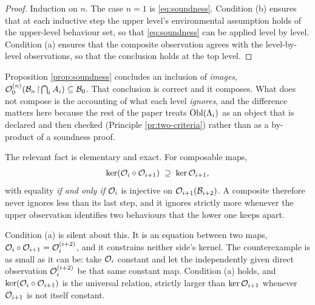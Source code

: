 \begin{proof}
Induction on $n$. The case $n = 1$ is \eqref{eq:soundness}. Condition (b) ensures that at
each inductive step the upper level's environmental assumption holds of the upper-level
behaviour set, so that \eqref{eq:soundness} can be applied level by level. Condition (a)
ensures that the composite observation agrees with the level-by-level observations, so
that the conclusion holds at the top level.
\end{proof}

\begin{remark}\label{rmk:kernel-accounting}
Proposition \ref{prop:soundness} concludes an inclusion of \emph{images},
$\mathcal{O}_0^{(n)}(\mathcal{B}_n\!\upharpoonright\!\bigcap_i A_i) \subseteq \mathcal{B}_0$. That conclusion is correct
and it composes. What does not compose is the accounting of what each level \emph{ignores}, and the
difference matters here because the rest of the paper treats $\operatorname{Obl}(\Lambda_i)$ as an object that is
declared and then checked (Principle \ref{pr:two-criteria}) rather than as a by-product of a
soundness proof.

The relevant fact is elementary and exact. For composable maps,
\begin{equation}\label{eq:kernel-mono}
\ker(\mathcal{O}_i \circ \mathcal{O}_{i+1}) \;\supseteq\; \ker \mathcal{O}_{i+1},
\end{equation}
with equality \emph{if and only if} $\mathcal{O}_i$ is injective on $\mathcal{O}_{i+1}(\mathcal{B}_{i+2})$. A composite
therefore never ignores less than its last step, and it ignores strictly more whenever the upper
observation identifies two behaviours that the lower one keeps apart.

Condition (a) is silent about this. It is an equation between two maps,
$\mathcal{O}_i \circ \mathcal{O}_{i+1} = \mathcal{O}_i^{(i+2)}$, and it constrains neither side's kernel. The
counterexample is as small as it can be: take $\mathcal{O}_i$ constant and let the independently given
direct observation $\mathcal{O}_i^{(i+2)}$ be that same constant map. Condition (a) holds, and
$\ker(\mathcal{O}_i \circ \mathcal{O}_{i+1})$ is the universal relation, strictly larger than $\ker\mathcal{O}_{i+1}$
whenever $\mathcal{O}_{i+1}$ is not itself constant.


\end{remark}
